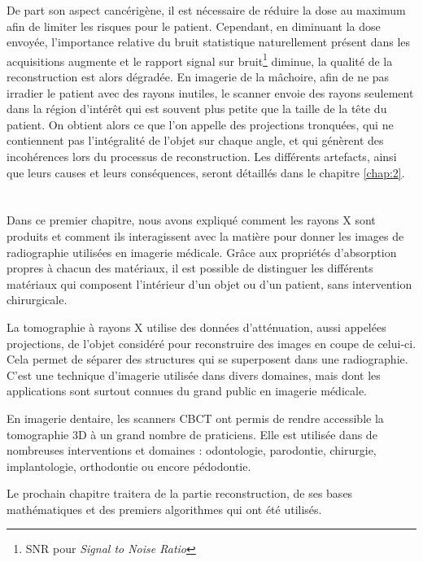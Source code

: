 De part son aspect cancérigène, il est nécessaire de réduire la dose au maximum afin de limiter les risques pour le patient. Cependant, en diminuant la dose envoyée, l'importance relative du  bruit statistique naturellement présent dans les acquisitions augmente et le rapport signal sur bruit{\hypersetup{linkcolor=black}\footnote{SNR pour \textit{Signal to Noise Ratio}}} diminue, la qualité de la reconstruction est alors dégradée. 
En imagerie de la mâchoire, afin de ne pas irradier le patient avec des rayons inutiles, le scanner envoie des rayons seulement dans la région d'intérêt qui est souvent plus petite que la taille de la tête du patient. On obtient alors ce que l'on appelle des projections tronquées, qui ne contiennent pas l'intégralité de l'objet sur chaque angle, et qui génèrent des incohérences lors du processus de reconstruction. Les différents artefacts, ainsi que leurs causes et leurs conséquences, seront détaillés dans le chapitre \ref{chap:2}.


\section*{}

Dans ce premier chapitre, nous avons expliqué comment les rayons X sont produits et comment ils interagissent avec la matière pour donner les images de radiographie utilisées en imagerie médicale. Grâce aux propriétés d'absorption propres à chacun des matériaux, il est possible de distinguer les différents matériaux qui composent l'intérieur d'un objet ou d'un patient, sans intervention chirurgicale. 

La tomographie à rayons X utilise des données d'atténuation, aussi appelées projections, de l'objet considéré pour reconstruire des images en coupe de celui-ci. Cela permet de séparer des structures qui se superposent dans une radiographie. C'est une technique d'imagerie utilisée dans divers domaines, mais dont les applications sont surtout connues du grand public en imagerie médicale. 

En imagerie dentaire, les scanners CBCT ont permis de rendre accessible la tomographie 3D à un grand nombre de praticiens. Elle est utilisée dans de nombreuses interventions et domaines : odontologie, parodontie, chirurgie, implantologie, orthodontie ou encore pédodontie.  

Le prochain chapitre traitera de la partie reconstruction, de ses bases mathématiques et des premiers algorithmes qui ont été utilisés.

\vfill




